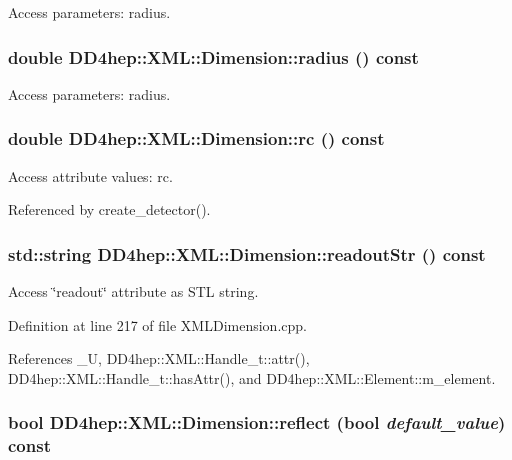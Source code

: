 Access parameters: radius. \hypertarget{struct_d_d4hep_1_1_x_m_l_1_1_dimension_adcc00f73aeb47222beb5fc99c6d071ef}{
\subsubsection[{radius}]{\setlength{\rightskip}{0pt plus 5cm}double DD4hep::XML::Dimension::radius () const}}
\label{struct_d_d4hep_1_1_x_m_l_1_1_dimension_adcc00f73aeb47222beb5fc99c6d071ef}


Access parameters: radius. \hypertarget{struct_d_d4hep_1_1_x_m_l_1_1_dimension_aba7e86be01f95779fca80cfc373e7b3c}{
\subsubsection[{rc}]{\setlength{\rightskip}{0pt plus 5cm}double DD4hep::XML::Dimension::rc () const}}
\label{struct_d_d4hep_1_1_x_m_l_1_1_dimension_aba7e86be01f95779fca80cfc373e7b3c}


Access attribute values: rc. 

Referenced by create\_\-detector().\hypertarget{struct_d_d4hep_1_1_x_m_l_1_1_dimension_a1a1259503fd5a87ac94ca513a5c917c7}{
\subsubsection[{readoutStr}]{\setlength{\rightskip}{0pt plus 5cm}std::string DD4hep::XML::Dimension::readoutStr () const}}
\label{struct_d_d4hep_1_1_x_m_l_1_1_dimension_a1a1259503fd5a87ac94ca513a5c917c7}


Access \char`\"{}readout\char`\"{} attribute as STL string. 

Definition at line 217 of file XMLDimension.cpp.

References \_\-U, DD4hep::XML::Handle\_\-t::attr(), DD4hep::XML::Handle\_\-t::hasAttr(), and DD4hep::XML::Element::m\_\-element.\hypertarget{struct_d_d4hep_1_1_x_m_l_1_1_dimension_a31eb2535fb87f42a82736f186ebda481}{
\subsubsection[{reflect}]{\setlength{\rightskip}{0pt plus 5cm}bool DD4hep::XML::Dimension::reflect (bool {\em default\_\-value}) const}}
\label{struct_d_d4hep_1_1_x_m_l_1_1_dimension_a31eb2535fb87f42a82736f186ebda481}



